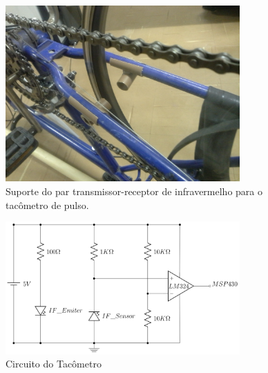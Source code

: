 \begin{figure}[h]
  \centering
  \includegraphics[width=0.8\textwidth]
      {figuras/sup_tac.jpg}
  \caption{Suporte do par transmissor-receptor de infravermelho para o tacômetro de pulso.}
  \label{fig:sens_tac}
\end{figure}

\begin{figure}[h]
  \centering
	\includegraphics[width=0.8\textwidth]{figuras/tacometro}
  \caption{Circuito do Tacômetro}
  \label{fig:figuras_tacometro}
\end{figure}



